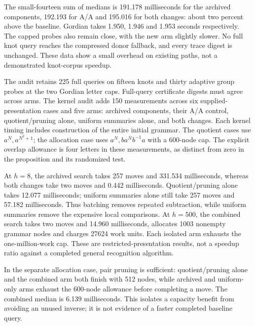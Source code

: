 

The small-fourteen sum of medians is 191.178 milliseconds for the archived
components, 192.193 for A/A and 195.016 for both changes: about two percent
above the baseline. Gordian takes 1.950, 1.946 and 1.953 seconds respectively.
The capped probes also remain close, with the new arm slightly slower.
No full knot query reaches the compressed donor fallback, and every trace
digest is unchanged. These data show a small overhead on existing paths,
not a demonstrated knot-corpus speedup.

The audit retains 225 full queries on fifteen knots and thirty adaptive
group probes at the two Gordian letter caps. Full-query certificate digests
must agree across arms. The kernel audit adds 150 measurements across six
supplied-presentation cases and five arms: archived components, their A/A
control, quotient/pruning alone, uniform summaries alone, and both changes.
Each kernel timing includes construction of the entire initial grammar.
The quotient cases use $a^N,a^{N^2+1}$; the allocation case uses
$a^N,ba^Nb^{-1}a$ with a 600-node cap. The explicit overlap allowance is four
letters in these measurements, as distinct from zero in the proposition
and its randomized test.



At $h=8$, the archived search takes 257 moves and 331.534 milliseconds,
whereas both changes take two moves and 0.442 milliseconds. Quotient/pruning
alone takes 12.077 milliseconds; uniform summaries alone still take 257
moves and 57.182 milliseconds. Thus batching removes repeated subtraction,
while uniform summaries remove the expensive local comparisons. At $h=500$,
the combined search takes two moves and 14.960 milliseconds, allocates 1003
nonempty grammar nodes and charges 27624 work units. Each isolated arm
exhausts the one-million-work cap. These are restricted-presentation results,
not a speedup ratio against a completed general recognition algorithm.

In the separate allocation case, pair pruning is sufficient: quotient/pruning
alone and the combined arm both finish with 512 nodes, while archived and
uniform-only arms exhaust the 600-node allowance before completing a move.
The combined median is 6.139 milliseconds. This isolates a capacity benefit
from avoiding an unused inverse; it is not evidence of a faster completed
baseline query.

